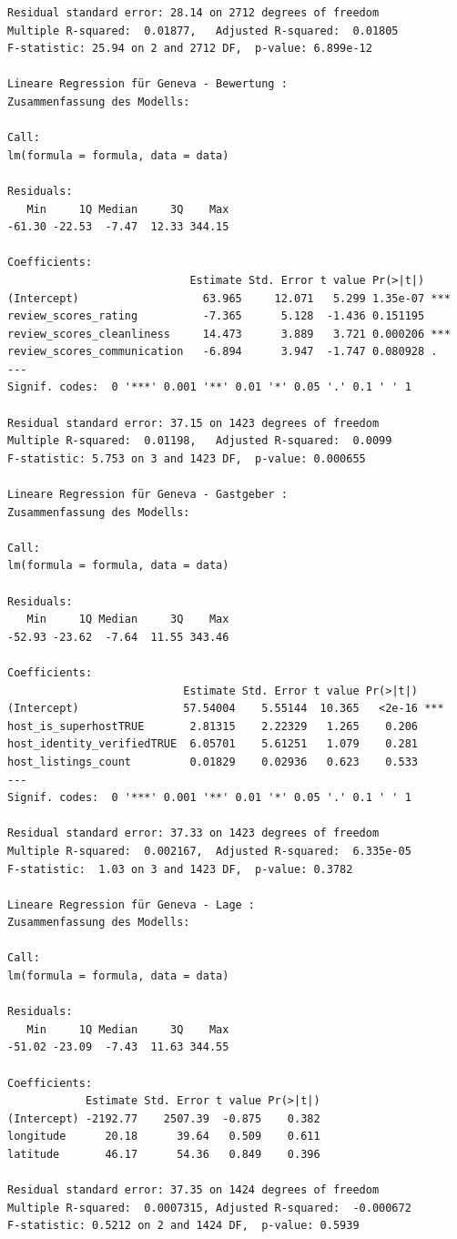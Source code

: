 \documentclass[
  journal,
]{IEEEtran}%
\begin{document}
\begin{verbatim}
Residual standard error: 28.14 on 2712 degrees of freedom
Multiple R-squared:  0.01877,   Adjusted R-squared:  0.01805 
F-statistic: 25.94 on 2 and 2712 DF,  p-value: 6.899e-12

Lineare Regression für Geneva - Bewertung :
Zusammenfassung des Modells:

Call:
lm(formula = formula, data = data)

Residuals:
   Min     1Q Median     3Q    Max 
-61.30 -22.53  -7.47  12.33 344.15 

Coefficients:
                            Estimate Std. Error t value Pr(>|t|)    
(Intercept)                   63.965     12.071   5.299 1.35e-07 ***
review_scores_rating          -7.365      5.128  -1.436 0.151195    
review_scores_cleanliness     14.473      3.889   3.721 0.000206 ***
review_scores_communication   -6.894      3.947  -1.747 0.080928 .  
---
Signif. codes:  0 '***' 0.001 '**' 0.01 '*' 0.05 '.' 0.1 ' ' 1

Residual standard error: 37.15 on 1423 degrees of freedom
Multiple R-squared:  0.01198,   Adjusted R-squared:  0.0099 
F-statistic: 5.753 on 3 and 1423 DF,  p-value: 0.000655

Lineare Regression für Geneva - Gastgeber :
Zusammenfassung des Modells:

Call:
lm(formula = formula, data = data)

Residuals:
   Min     1Q Median     3Q    Max 
-52.93 -23.62  -7.64  11.55 343.46 

Coefficients:
                           Estimate Std. Error t value Pr(>|t|)    
(Intercept)                57.54004    5.55144  10.365   <2e-16 ***
host_is_superhostTRUE       2.81315    2.22329   1.265    0.206    
host_identity_verifiedTRUE  6.05701    5.61251   1.079    0.281    
host_listings_count         0.01829    0.02936   0.623    0.533    
---
Signif. codes:  0 '***' 0.001 '**' 0.01 '*' 0.05 '.' 0.1 ' ' 1

Residual standard error: 37.33 on 1423 degrees of freedom
Multiple R-squared:  0.002167,  Adjusted R-squared:  6.335e-05 
F-statistic:  1.03 on 3 and 1423 DF,  p-value: 0.3782

Lineare Regression für Geneva - Lage :
Zusammenfassung des Modells:

Call:
lm(formula = formula, data = data)

Residuals:
   Min     1Q Median     3Q    Max 
-51.02 -23.09  -7.43  11.63 344.55 

Coefficients:
            Estimate Std. Error t value Pr(>|t|)
(Intercept) -2192.77    2507.39  -0.875    0.382
longitude      20.18      39.64   0.509    0.611
latitude       46.17      54.36   0.849    0.396

Residual standard error: 37.35 on 1424 degrees of freedom
Multiple R-squared:  0.0007315, Adjusted R-squared:  -0.000672 
F-statistic: 0.5212 on 2 and 1424 DF,  p-value: 0.5939
\end{verbatim}
\end{document}
